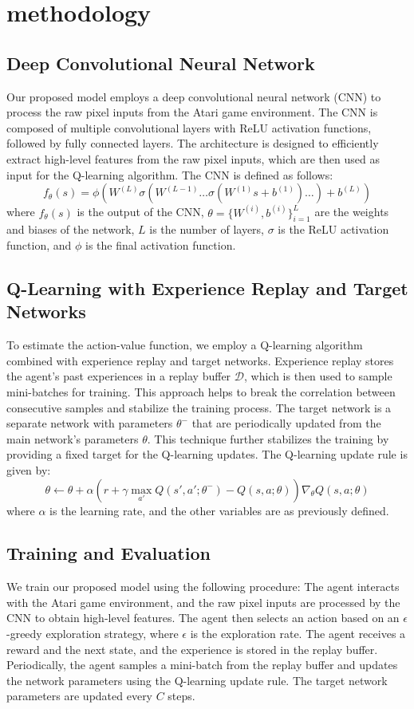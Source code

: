 \section{methodology}
\subsection{Deep Convolutional Neural Network}
Our proposed model employs a deep convolutional neural network (CNN) to process the raw pixel inputs from the Atari game environment. The CNN is composed of multiple convolutional layers with ReLU activation functions, followed by fully connected layers. The architecture is designed to efficiently extract high-level features from the raw pixel inputs, which are then used as input for the Q-learning algorithm. The CNN is defined as follows:
\[f_{\theta}(s) = \phi(W^{(L)}\sigma(W^{(L-1)}\dots\sigma(W^{(1)}s + b^{(1)})\dots) + b^{(L)})\]
where $f_{\theta}(s)$ is the output of the CNN, $\theta = \{W^{(i)}, b^{(i)}\}_{i=1}^L$ are the weights and biases of the network, $L$ is the number of layers, $\sigma$ is the ReLU activation function, and $\phi$ is the final activation function.

\subsection{Q-Learning with Experience Replay and Target Networks}
To estimate the action-value function, we employ a Q-learning algorithm combined with experience replay and target networks. Experience replay stores the agent's past experiences in a replay buffer $\mathcal{D}$, which is then used to sample mini-batches for training. This approach helps to break the correlation between consecutive samples and stabilize the training process. The target network is a separate network with parameters $\theta^{-}$ that are periodically updated from the main network's parameters $\theta$. This technique further stabilizes the training by providing a fixed target for the Q-learning updates. The Q-learning update rule is given by:
\[\theta \leftarrow \theta + \alpha (r + \gamma \max_{a'} Q(s', a'; \theta^{-}) - Q(s, a; \theta))\nabla_{\theta} Q(s, a; \theta)\]
where $\alpha$ is the learning rate, and the other variables are as previously defined.

\subsection{Training and Evaluation}
We train our proposed model using the following procedure: The agent interacts with the Atari game environment, and the raw pixel inputs are processed by the CNN to obtain high-level features. The agent then selects an action based on an $\epsilon$-greedy exploration strategy, where $\epsilon$ is the exploration rate. The agent receives a reward and the next state, and the experience is stored in the replay buffer. Periodically, the agent samples a mini-batch from the replay buffer and updates the network parameters using the Q-learning update rule. The target network parameters are updated every $C$ steps.

